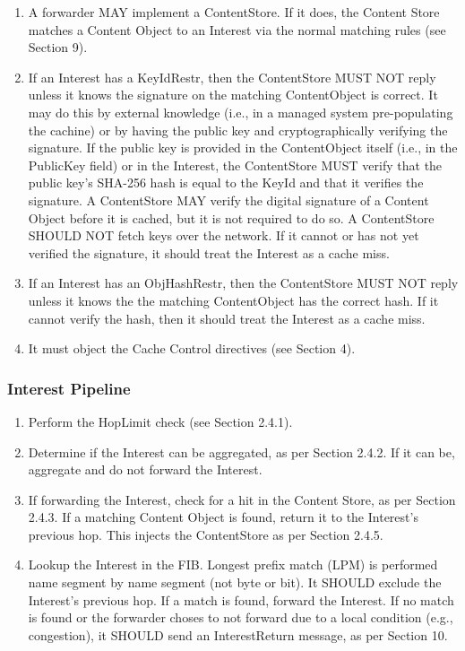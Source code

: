 \documentclass[12pt]{article}
\begin{document}
\begin{enumerate}
\item  A forwarder MAY implement a ContentStore.  If it does, the
    Content Store matches a Content Object to an Interest via the
    normal matching rules (see Section 9).

\item  If an Interest has a KeyIdRestr, then the ContentStore MUST NOT
    reply unless it knows the signature on the matching ContentObject
    is correct.  It may do this by external knowledge (i.e., in a
    managed system pre-populating the cachine) or by having the
    public key and cryptographically verifying the signature.  If the
    public key is provided in the ContentObject itself (i.e., in the
    PublicKey field) or in the Interest, the ContentStore MUST verify
    that the public key's SHA-256 hash is equal to the KeyId and that
    it verifies the signature.  A ContentStore MAY verify the digital
    signature of a Content Object before it is cached, but it is not
    required to do so.  A ContentStore SHOULD NOT fetch keys over the
    network.  If it cannot or has not yet verified the signature, it
    should treat the Interest as a cache miss.

\item  If an Interest has an ObjHashRestr, then the ContentStore MUST
    NOT reply unless it knows the the matching ContentObject has the
    correct hash.  If it cannot verify the hash, then it should treat
    the Interest as a cache miss.

\item  It must object the Cache Control directives (see Section 4).
\end{enumerate}

\subsubsection{Interest Pipeline}
\begin{enumerate}
\item  Perform the HopLimit check (see Section 2.4.1).

\item Determine if the Interest can be aggregated, as per
     Section 2.4.2.  If it can be, aggregate and do not forward the
     Interest.


\item If forwarding the Interest, check for a hit in the Content Store,
    as per Section 2.4.3.  If a matching Content Object is found,
    return it to the Interest's previous hop.  This injects the
    ContentStore as per Section 2.4.5.

\item Lookup the Interest in the FIB.  Longest prefix match (LPM) is
    performed name segment by name segment (not byte or bit).  It
    SHOULD exclude the Interest's previous hop.  If a match is found,
    forward the Interest.  If no match is found or the forwarder
    choses to not forward due to a local condition (e.g.,
    congestion), it SHOULD send an InterestReturn message, as per
    Section 10.
\end{enumerate}
\end{document}
